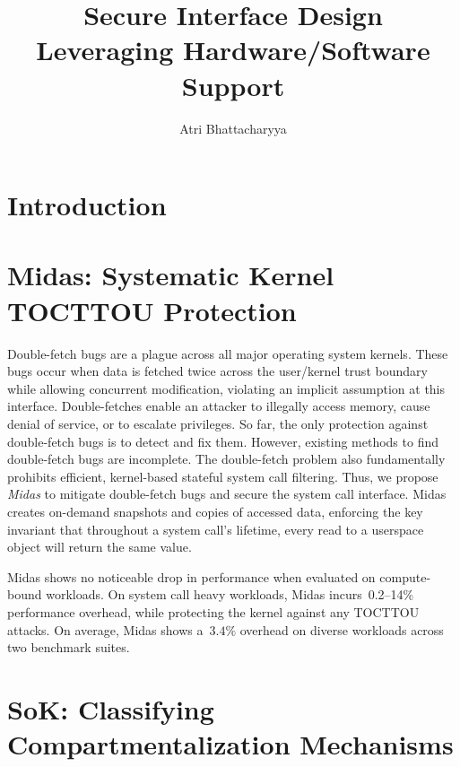 \documentclass[lablogo]{thesis}
\title{Secure Interface Design \\Leveraging Hardware/Software Support}
\author{Atri Bhattacharyya}
\newcommand{\tocttou}{TOCTTOU\xspace}
\newcommand{\midas}{Midas\xspace}
\begin{document}
\chapter{Introduction}




\chapter{Midas: Systematic Kernel \tocttou Protection}
\label{ch:midas}

Double-fetch bugs are a plague across all major operating system kernels. 
These bugs occur when data is fetched twice across the user/kernel trust 
boundary while allowing concurrent modification, violating an implicit
assumption at this interface.
Double-fetches enable an attacker to illegally access memory, cause 
denial of service, or to escalate privileges.
%
So far, the only protection against double-fetch bugs is to detect and fix them.
However, existing methods to find double-fetch bugs are incomplete.
%
The double-fetch problem also fundamentally prohibits efficient, kernel-based
stateful system call filtering.
Thus, we propose \emph{\midas} to mitigate double-fetch bugs and secure the
system call interface.
\midas creates on-demand
snapshots and copies of accessed data, enforcing the key invariant
that throughout a system call's lifetime, every read to a userspace object
will return the same value.

\midas shows no noticeable drop in performance when evaluated on compute-bound
workloads. 
On system call heavy workloads, \midas incurs~0.2--14\% performance overhead, 
while protecting the kernel against any \tocttou attacks. 
On average, \midas shows a~$3.4\%$ overhead on diverse workloads across two 
benchmark suites.

\newpage


\chapter{SoK: Classifying Compartmentalization Mechanisms}
\label{ch:compsok}
\end{document}
